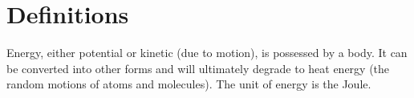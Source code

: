 




\addtolength{\topmargin}{-0.7 cm}
\setlength{\columnsep}{22pt}

\section{Definitions}
Energy, either potential or kinetic (due to motion), is possessed by a body.  It can be converted into other forms and will ultimately degrade to heat energy (the random motions of atoms and molecules).  The unit of energy is the Joule.

